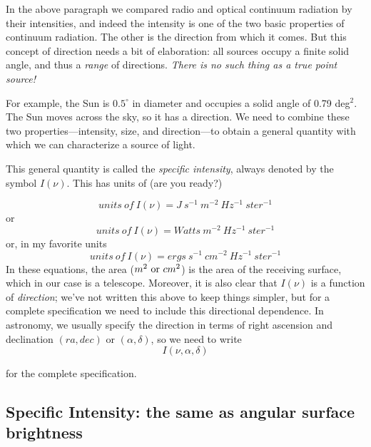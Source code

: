 \documentclass[12pt,psfig,preprint]{aastex}
\begin{document}
	In the above paragraph we compared radio and optical continuum
radiation by their intensities, and indeed the intensity is one of the
two basic properties of continuum radiation.  The other is the direction
from which it comes.  But this concept of direction needs a bit of
elaboration: all sources occupy a finite solid angle, and thus a {\it
range} of directions. {\it There is no such thing as a true point
source!} 

	For example, the Sun is $0.5^\circ$ in diameter and occupies a
solid angle of 0.79 deg$^2$.  The Sun moves across the sky, so it has a
direction. We need to combine these two properties---intensity, size, and
direction---to obtain a general quantity with which we can characterize
a source of light. 

This general quantity is called the {\it specific intensity}, always
denoted by the symbol $I(\nu)$.  This has units of (are you ready?)
%
\begin{mathletters}
\begin{equation}
units \ of \ I(\nu) = J \ s^{-1} \ m^{-2} \ Hz^{-1} \ ster^{-1}
\end{equation}
%
\noindent or
%
\begin{equation}
units \ of \ I(\nu) = Watts \ m^{-2} \ Hz^{-1} \ ster^{-1}
\end{equation}
%
\noindent or, in my favorite units
%
\begin{equation}
units \ of \ I(\nu) = ergs \ s^{-1} \ cm^{-2} \ Hz^{-1} \ ster^{-1}
\end{equation}
%
\noindent In these equations, the area ($m^2 \ {\rm or} \ cm^2$) is the
area of the receiving surface, which in our case is a telescope.
Moreover, it is also clear that $I(\nu)$ is a function of {\it
direction}; we've not written this above to keep things simpler, but for
a complete specification we need to include this directional dependence.
In astronomy, we usually specify the direction in terms of right
ascension and declination $(ra, dec)$ or $(\alpha, \delta)$, so we need
to write
%
\begin{equation}
I(\nu, \alpha, \delta)
\end{equation}
\end{mathletters}
%
\noindent for the complete specification.

\subsection{Specific Intensity: the same as  angular surface brightness}
\end{document}
